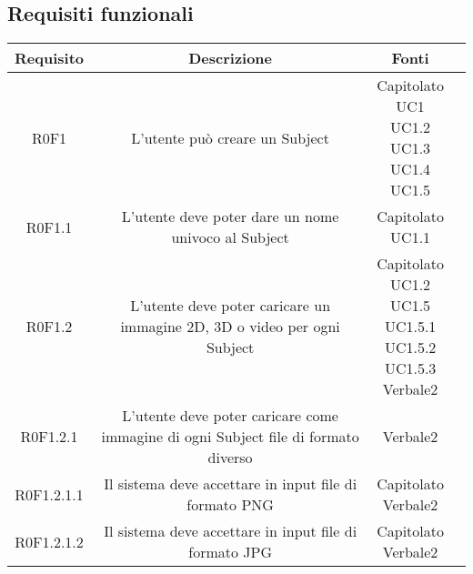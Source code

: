 \subsection{Requisiti funzionali}
\label{requisitifunzionali}
\newdimen\larghezza
\setlength{\larghezza}{7cm}
\newdimen\dimTipo
\setlength{\dimTipo}{2cm}
\newdimen\dimFonti
\setlength{\dimFonti}{2cm}
	
\begin{center}
\begin{longtable}{|c|c|c|c|}
\hline

\textbf{Requisito} & \textbf{Descrizione} & \textbf{Fonti} \\


\hline
R0F1   & \parbox[t]{\larghezza}{L'utente può creare un Subject\glossario{}}  & \parbox[t]{\dimFonti}{ Capitolato \\ UC1 \\ UC1.2 \\ UC1.3 \\ UC1.4 \\ UC1.5 \\} \\
\hline
R0F1.1   & \parbox[t]{\larghezza}{L'utente deve poter dare un nome univoco al Subject\glossario{}}  & \parbox[t]{\dimFonti}{ Capitolato \\ UC1.1 \\} \\
\hline
R0F1.2   & \parbox[t]{\larghezza}{L'utente deve poter caricare un immagine 2D, 3D o video per ogni Subject\glossario{}}  & \parbox[t]{\dimFonti}{ Capitolato \\ UC1.2 \\ UC1.5 \\ UC1.5.1 \\ UC1.5.2 \\ UC1.5.3 \\ Verbale2 \\} \\
\hline
R0F1.2.1   & \parbox[t]{\larghezza}{L'utente deve poter caricare come immagine di ogni Subject\glossario{} file di formato diverso}  & \parbox[t]{\dimFonti}{ Verbale2 \\} \\
\hline
R0F1.2.1.1   & \parbox[t]{\larghezza}{Il sistema deve accettare in input file di formato PNG\glossario{}}  & \parbox[t]{\dimFonti}{ Capitolato \\ Verbale2 \\} \\
\hline
R0F1.2.1.2   & \parbox[t]{\larghezza}{Il sistema deve accettare in input file di formato JPG\glossario{}}  & \parbox[t]{\dimFonti}{ Capitolato \\ Verbale2 \\} \\

\end{longtable}
\end{center}
